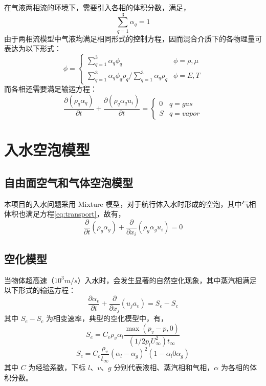 在气液两相流的环境下，需要引入各相的体积分数，满足，
\begin{equation}
  \sum _{q = 1} ^3 \alpha _q = 1
\end{equation}
由于两相流模型中气液均满足相同形式的控制方程，因而混合介质下的各物理量可表达为以下形式：
\begin{equation}
  \phi = \begin{cases}
    \sum _{q = 1} ^3 \alpha_q \phi_q & \phi = \rho, \mu \\
    \sum _{q = 1} ^3 \alpha_q \phi_q \rho_q \bigg/ \sum _{q = 1} ^3 \alpha _q \rho _q & \phi = E, T
  \end{cases}
\end{equation}
而各相还需要满足输运方程：
\begin{equation}
  \frac {\partial (\rho _q \alpha _q)} {\partial t} + \frac {\partial (\rho _q \alpha _q u_i)}{\partial t} = \begin{cases}
    0 & q = gas \\
    S & q = vapor
  \end{cases}
  \label{eq:transport}
\end{equation}

\section{入水空泡模型}

\subsection{自由面空气和气体空泡模型}
本项目的入水问题采用 Mixture 模型，对于航行体入水时形成的空泡，其中气相体积也满足方程\ref{eq:transport}，故有，
\begin{equation}
  \frac \partial {\partial t} (\rho _g \alpha_g) + \frac \partial {\partial x_i} (\rho _g \alpha _g u_i) = 0
\end{equation}

\subsection{空化模型}
当物体超高速（$10^3 m/s$）入水时，会发生显著的自然空化现象，其中蒸汽相满足以下形式的输运方程：
\begin{equation}
  \frac {\partial \alpha _v}{\partial t} + \frac \partial {\partial x_j} (u_j a_v) = S_e - S_c
\end{equation}
其中 $S_e - S_c$ 为相变速率，典型的空化模型中，有，
\begin{equation}
  S_e = C_e \rho _v \alpha _l \frac {\max (p_v - p, 0)} {(1 / 2 p_l U _{\infty} ^2) t _{\infty}}
\end{equation}
\begin{equation}
  S_c = C_c \frac {\rho _v}{t _{\infty}} (\alpha _l - \alpha _g) ^2 (1 - \alpha_l 0 \alpha_g)
\end{equation}
其中 $C$ 为经验系数，下标 $l$、$v$、$g$ 分别代表液相、蒸汽相和气相，$\alpha$ 为各相的体积分数。